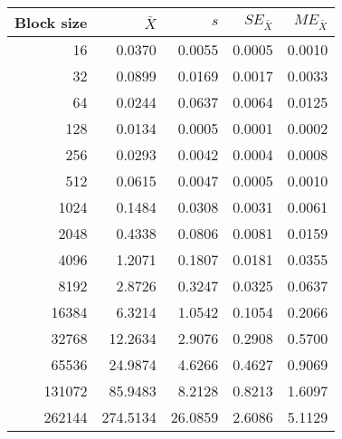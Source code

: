 \begin{tabular}{rrrrr}\toprule
{\small Block size} & $\bar{X}$ & $s$ & $SE_{\bar{X}}$ & $ME_{\bar{X}}$ \\\midrule
16 & 0.0370 & 0.0055 & 0.0005 & 0.0010\\
32 & 0.0899 & 0.0169 & 0.0017 & 0.0033\\
64 & 0.0244 & 0.0637 & 0.0064 & 0.0125\\
128 & 0.0134 & 0.0005 & 0.0001 & 0.0002\\
256 & 0.0293 & 0.0042 & 0.0004 & 0.0008\\
512 & 0.0615 & 0.0047 & 0.0005 & 0.0010\\
1024 & 0.1484 & 0.0308 & 0.0031 & 0.0061\\
2048 & 0.4338 & 0.0806 & 0.0081 & 0.0159\\
4096 & 1.2071 & 0.1807 & 0.0181 & 0.0355\\
8192 & 2.8726 & 0.3247 & 0.0325 & 0.0637\\
16384 & 6.3214 & 1.0542 & 0.1054 & 0.2066\\
32768 & 12.2634 & 2.9076 & 0.2908 & 0.5700\\
65536 & 24.9874 & 4.6266 & 0.4627 & 0.9069\\
131072 & 85.9483 & 8.2128 & 0.8213 & 1.6097\\
262144 & 274.5134 & 26.0859 & 2.6086 & 5.1129\\
\bottomrule
\end{tabular}
